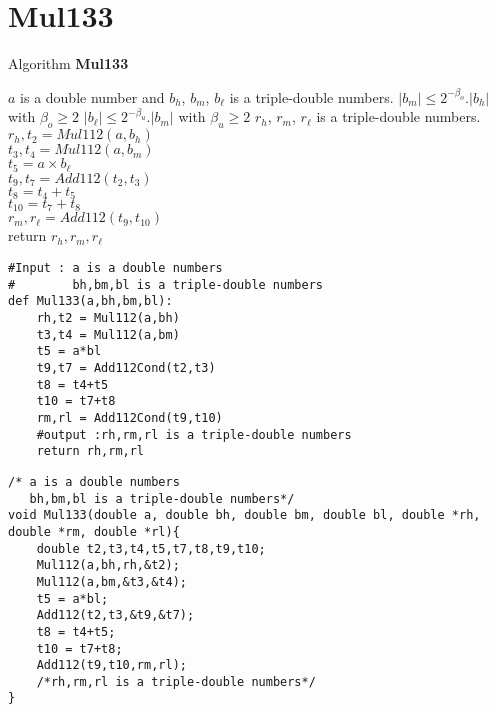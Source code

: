 \section*{Mul133}
\begin{algorithm}[htbp]
  \caption{Algorithm \textbf{Mul133}}
\begin{algorithmic}[1]
\Input $a$ is a double number and $b_h$, $b_m$, $b_{\ell}$ is a triple-double numbers.
\Condition $\lvert b_m \rvert \le 2^{-\beta_o}.\lvert b_h \rvert$ with $\beta_o \ge 2$
\Condition $\lvert b_{\ell} \rvert \le 2^{-\beta_u}.\lvert b_m \rvert$ with $\beta_u \ge 2$
\Output $r_h$, $r_m$, $r_{\ell}$ is a triple-double numbers.
\State $r_h,t_2 = Mul112(a,b_h)$\\
    $t_3,t_4 = Mul112(a,b_m)$\\
    $t_5 = a\times b_{\ell}$\\
    $t_9,t_7 = Add112(t_2,t_3)$\\
    $t_8 = t_4+t_5$ \\
    $t_{10} = t_7+t_8$\\
    $r_m,r_{\ell} = Add112(t_9,t_{10})$\\
    return $r_h,r_m,r_{\ell}$
\end{algorithmic}
\label{algo:Mul133}
\end{algorithm}

\begin{lstlisting}
#Input : a is a double numbers
#        bh,bm,bl is a triple-double numbers
def Mul133(a,bh,bm,bl):
    rh,t2 = Mul112(a,bh)
    t3,t4 = Mul112(a,bm)
    t5 = a*bl
    t9,t7 = Add112Cond(t2,t3)
    t8 = t4+t5
    t10 = t7+t8
    rm,rl = Add112Cond(t9,t10)
    #output :rh,rm,rl is a triple-double numbers
    return rh,rm,rl
\end{lstlisting}

\begin{lstlisting}
/* a is a double numbers
   bh,bm,bl is a triple-double numbers*/
void Mul133(double a, double bh, double bm, double bl, double *rh, double *rm, double *rl){
    double t2,t3,t4,t5,t7,t8,t9,t10;
    Mul112(a,bh,rh,&t2);
    Mul112(a,bm,&t3,&t4);
    t5 = a*bl;
    Add112(t2,t3,&t9,&t7);
    t8 = t4+t5;
    t10 = t7+t8;
    Add112(t9,t10,rm,rl);
    /*rh,rm,rl is a triple-double numbers*/
}
\end{lstlisting}
\newpage

